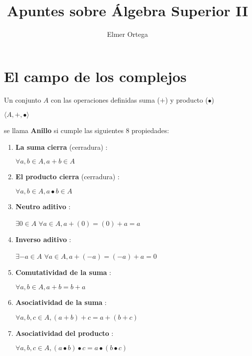\documentclass[12pt]{article}
\begin{document}
\title{Apuntes sobre Álgebra Superior II}
\author{Elmer Ortega}
\maketitle
\section*{El campo de los complejos}
Un conjunto $A$ con las operaciones definidas suma ($+$) y producto ($\bullet$)
\begin{center}
    $\langle A, +, \bullet \rangle$
\end{center}
se llama \textbf{Anillo} si cumple las siguientes 8 propiedades:
\begin{enumerate}
    \item \textbf{La suma cierra}  (cerradura) : 
    \begin{center}
        $\forall a,b \in A,  a+b\in A$
    \end{center}
    \item \textbf{El producto cierra}  (cerradura) : 
    \begin{center}
        $\forall a,b \in A,  a \bullet b\in A$
    \end{center}
    \item \textbf{Neutro aditivo} : 
    \begin{center}
        $\exists{ } 0 \in A$  $\forall a \in A, a+(0)=(0)+a=a$
    \end{center}
    \item \textbf{Inverso aditivo} : 
    \begin{center}
        $\exists -a \in A$  $\forall a \in A, a+(-a)=(-a)+a=0$
    \end{center}
    \item \textbf{Comutatividad de la suma} : 
    \begin{center}
        $\forall a,b \in A,  a+b=b+a$
    \end{center}
    \item \textbf{Asociatividad de la suma} : 
    \begin{center}
        $\forall a,b,c \in A, (a+b)+c=a+(b+c)$
    \end{center}
    \item \textbf{Asociatividad del producto} : 
    \begin{center}
        $\forall a,b,c \in A, (a\bullet b)\bullet c = a \bullet (b \bullet c)$
    \end{center}

\end{enumerate}
\end{document}
